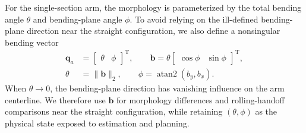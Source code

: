 \documentclass[journal,twoside]{IEEEtran}
\begin{document}
For the single-section arm, the morphology is parameterized by the total bending angle $\theta$ and bending-plane angle $\phi$. To avoid relying on the ill-defined bending-plane direction near the straight configuration, we also define a nonsingular bending vector
\begin{equation}
\begin{aligned}
\mathbf q_a&=\begin{bmatrix}\theta&\phi\end{bmatrix}^{\!\mathrm T},\qquad
\mathbf b=\theta\begin{bmatrix}\cos\phi&\sin\phi\end{bmatrix}^{\!\mathrm T},\\
\theta&=\|\mathbf b\|_2,\qquad
\phi=\operatorname{atan2}(b_y,b_x).
\end{aligned}
\label{eq:morphology_state}
\end{equation}
When $\theta\rightarrow 0$, the bending-plane direction has vanishing influence on the arm centerline. We therefore use $\mathbf b$ for morphology differences and rolling-handoff comparisons near the straight configuration, while retaining $(\theta,\phi)$ as the physical state exposed to estimation and planning.
\end{document}
